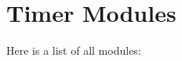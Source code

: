 \section{Timer Modules}
Here is a list of all modules:\begin{CompactList}
\item {}
\end{CompactList}
